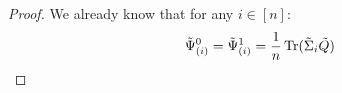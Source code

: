 \documentclass[a4papaer, titlepage]{book}
\begin{document}
\begin{proof}
 We already know that for any $i \in [n]$:
  \begin{align*}
     \tilde \Psi_{(i)} ^0 = \tilde \Psi_{(i)} ^1 = \frac{1}{n} \tr (\tilde \Sigma_i \tilde Q)

\end{align*}
\end{proof}
\end{document}
